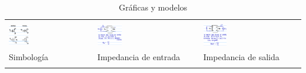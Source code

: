 \documentclass[10pt]{article}
\begin{document}
\begin{table}
\begin{tabular}{|p{}|p{}|p{}|}
			&\\
			\hline
			&\\
			\includegraphics[width=0.25\textwidth, keepaspectratio]{symbols}
			& \includegraphics[width=0.25\textwidth, keepaspectratio]{input-impedance}
			& \includegraphics[width=0.25\textwidth, keepaspectratio]{output-impedance} \\
			Simbología & Impedancia de entrada & Impedancia de salida \\
			&\\
			\hline
		\end{tabular}
		\caption{Gráficas y modelos}
	\end{table}
\end{document}
